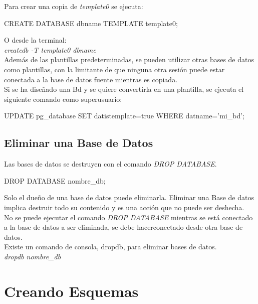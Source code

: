 Para crear una copia de \textit{template0} se ejecuta:\\

\begin{pyglist}
CREATE DATABASE dbname TEMPLATE template0;
\end{pyglist}

O desde la terminal:\\

\textit{createdb -T template0 dbname}\\

Además de las plantillas predeterminadas, se pueden utilizar otras bases de datos como plantillas, con la limitante de que ninguna otra sesión puede estar conectada a la base de datos fuente mientras es copiada.\\

Si se ha diseñado una Bd y se quiere convertirla en una plantilla, se ejecuta el siguiente comando como superusuario:\\

\begin{pyglist}
UPDATE pg_database SET datistemplate=true WHERE datname='mi_bd';
\end{pyglist}

\subsection{Eliminar una Base de Datos}

Las bases de datos se destruyen con el comando \textit{DROP DATABASE}.\\

\begin{pyglist}
DROP DATABASE nombre_db;
\end{pyglist}

Solo el dueño de una base de datos puede eliminarla. Eliminar una Base de datos implica destruir todo su contenido y es una acción que no puede ser deshecha.\\

No se puede ejecutar el comando \textit{DROP DATABASE} mientras se está conectado a la base de datos a ser eliminada, se debe hacerconectado desde otra base de datos.\\

Existe un comando de consola, dropdb, para eliminar bases de datos.\\

\textit{dropdb nombre\_db}

\section{Creando Esquemas}


